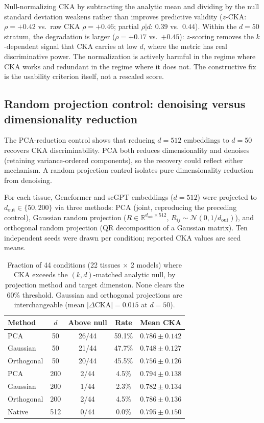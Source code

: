 \documentclass[11pt]{article}
\newcommand{\R}{\mathbb{R}}
\begin{document}
Null-normalizing CKA by subtracting the analytic mean and dividing by
the null standard deviation weakens rather than improves predictive
validity ($z$-CKA: $\rho = +0.42$ vs.\ raw CKA $\rho = +0.46$;
partial $\rho|d$: $0.39$ vs.\ $0.44$). Within the $d = 50$ stratum,
the degradation is larger ($\rho = +0.17$ vs.\ $+0.45$): $z$-scoring
removes the $k$-dependent signal that CKA carries at low $d$, where the
metric has real discriminative power. The normalization is actively
harmful in the regime where CKA works and redundant in the regime where
it does not. The constructive fix is the usability criterion itself,
not a rescaled score.


\subsection{Random projection control: denoising versus dimensionality reduction}
\label{sec:randproj}

The PCA-reduction control shows that reducing $d = 512$ embeddings to
$d = 50$ recovers CKA discriminability. PCA both reduces dimensionality
and denoises (retaining variance-ordered components), so the recovery
could reflect either mechanism. A random projection control isolates
pure dimensionality reduction from denoising.

For each tissue, Geneformer and scGPT embeddings ($d = 512$) were
projected to $d_{\mathrm{out}} \in \{50, 200\}$ via three methods:
PCA (joint, reproducing the preceding control), Gaussian random
projection ($R \in \R^{d_{\mathrm{out}} \times 512}$,
$R_{ij} \sim \mathcal{N}(0, 1/d_{\mathrm{out}})$), and orthogonal
random projection (QR decomposition of a Gaussian matrix). Ten
independent seeds were drawn per condition; reported CKA values are
seed means.

\medskip
\begin{table}[t]
\centering
\caption{Fraction of 44 conditions (22 tissues $\times$ 2 models) where
CKA exceeds the $(k, d)$-matched analytic null, by projection method and
target dimension. None clears the 60\% threshold.
Gaussian and orthogonal projections are interchangeable (mean
$|\Delta\text{CKA}| = 0.015$ at $d = 50$).}
\label{tab:randproj}
\small
\begin{tabular}{@{}lcccc@{}}
\toprule
Method & $d$ & Above null & Rate & Mean CKA \\
\midrule
PCA              & 50  & 26/44 & 59.1\% & $0.786 \pm 0.142$ \\
Gaussian         & 50  & 21/44 & 47.7\% & $0.748 \pm 0.127$ \\
Orthogonal       & 50  & 20/44 & 45.5\% & $0.756 \pm 0.126$ \\
\midrule
PCA              & 200 &  2/44 &  4.5\% & $0.794 \pm 0.138$ \\
Gaussian         & 200 &  1/44 &  2.3\% & $0.782 \pm 0.134$ \\
Orthogonal       & 200 &  2/44 &  4.5\% & $0.786 \pm 0.136$ \\
\midrule
Native           & 512 &  0/44 &  0.0\% & $0.795 \pm 0.150$ \\
\bottomrule
\end{tabular}
\end{table}
\end{document}
